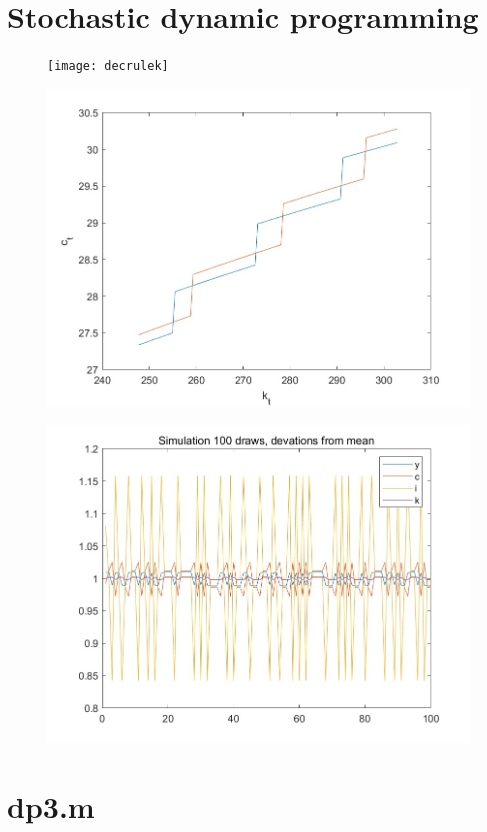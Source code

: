 \documentclass[a4paper,10pt]{article}
\begin{document}
\pagestyle{empty}
\section{Stochastic dynamic programming}

\begin{figure}[hb]
    \centering
    \texttt{[image: decrulek]}
\end{figure}

\begin{figure}[ht]
    \centering
    \includegraphics[width=1\linewidth]{decrulec}
\end{figure}

\begin{figure}[ht]
    \centering
    \includegraphics[width=1\linewidth]{simulation}
\end{figure}

\clearpage

\section{dp3.m}

\end{document}
